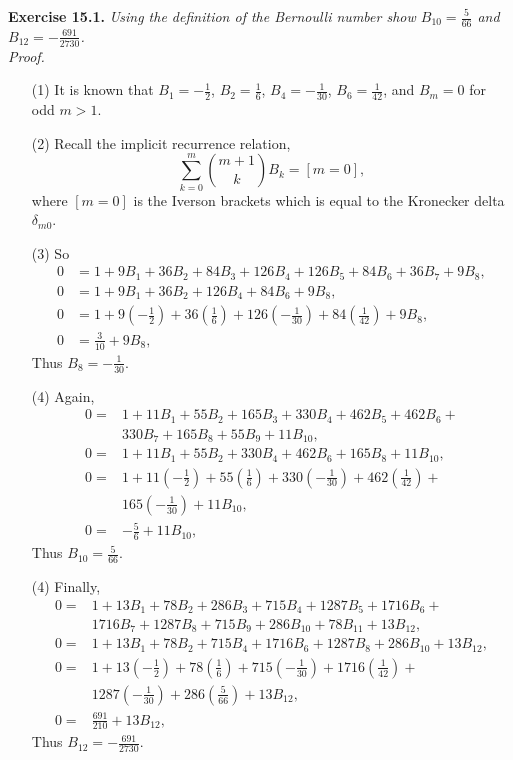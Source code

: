 \documentclass{article}
\begin{document}
\textbf{Exercise 15.1.}
\emph{Using the definition of the Bernoulli number show
$B_{10} = \frac{5}{66}$ and $B_{12} = -\frac{691}{2730}$.} \\

\emph{Proof.}
\begin{enumerate}
\item[(1)]
It is known that
$B_1 = -\frac{1}{2}$,
$B_2 = \frac{1}{6}$,
$B_4 = -\frac{1}{30}$,
$B_6 = \frac{1}{42}$,
and $B_m = 0$ for odd $m > 1$.
\item[(2)]
Recall the implicit recurrence relation,
$$\sum_{k = 0}^{m} {m+1 \choose k} B_k = [m = 0],$$
where $[m = 0]$ is the Iverson brackets which is equal to
the Kronecker delta $\delta_{m0}$.
\item[(3)]
So
\begin{align*}
0 &= 1 + 9 B_1 + 36 B_2 + 84 B_3 + 126 B_4 + 126 B_5 + 84 B_6 + 36 B_7 + 9 B_8, \\
0 &= 1 + 9 B_1 + 36 B_2 + 126 B_4 + 84 B_6 + 9 B_8, \\
0 &= 1 + 9 \left( -\frac{1}{2} \right)
+ 36 \left( \frac{1}{6} \right)
+ 126 \left( -\frac{1}{30} \right)
+ 84 \left( \frac{1}{42} \right)
+ 9 B_8, \\
0 &= \frac{3}{10} + 9B_8,
\end{align*}
Thus $B_8 = -\frac{1}{30}$. \\
\item[(4)]
Again,
\begin{align*}
0 =& 1 + 11 B_1 + 55 B_2 + 165 B_3 + 330 B_4 + 462 B_5 + 462 B_6 + \\
   & 330 B_7 + 165 B_8 + 55 B_9 + 11 B_{10}, \\
0 =& 1 + 11 B_1 + 55 B_2 + 330 B_4 + 462 B_6 + 165 B_8 + 11 B_{10}, \\
0 =& 1 + 11 \left( -\frac{1}{2} \right) +
     55 \left( \frac{1}{6} \right) +
     330 \left( -\frac{1}{30} \right) +
     462 \left( \frac{1}{42} \right) + \\
   & 165 \left( -\frac{1}{30} \right) +
     11 B_{10}, \\
0 =& -\frac{5}{6} + 11 B_{10},
\end{align*}
Thus $B_{10} = \frac{5}{66}$. \\
\item[(4)]
Finally,
\begin{align*}
0 =& 1 + 13 B_1 + 78 B_2 + 286 B_3 + 715 B_4 + 1287 B_5 + 1716 B_6 + \\
   & 1716 B_7 + 1287 B_8 + 715 B_9 + 286 B_{10} + 78 B_{11} + 13 B_{12}, \\
0 =& 1 + 13 B_1 + 78 B_2 + 715 B_4 + 1716 B_6 + 1287 B_8 + 286 B_{10} + 13 B_{12}, \\
0 =& 1 + 13 \left( -\frac{1}{2} \right) +
     78 \left( \frac{1}{6} \right) +
     715 \left( -\frac{1}{30} \right) +
     1716 \left( \frac{1}{42} \right) + \\
   & 1287 \left( -\frac{1}{30} \right) +
     286 \left( \frac{5}{66} \right) +
     13 B_{12}, \\
0 =& \frac{691}{210} + 13 B_{12},
\end{align*}
Thus $B_{12} = -\frac{691}{2730}$.
\end{enumerate}
\end{document}
